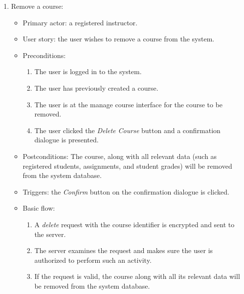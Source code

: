 \begin{enumerate}
\item Remove a course:
\begin{itemize}
    \item Primary actor: a registered instructor.
    \item User story: the user wishes to remove a course from the system.
    \item Preconditions:
        \begin{enumerate}
            \item The user is logged in to the system.
            \item The user has previously created a course.
            \item The user is at the manage course interface for the course
                to be removed.
            \item The user clicked the \emph{Delete Course} button and a
                confirmation dialogue is presented.
        \end{enumerate}
    \item Postconditions:
        The course, along with all relevant data (such as registered students,
        assignments, and student grades) will be removed from the system
        database.
    \item Triggers: the \emph{Confirm} button on the confirmation dialogue is
        clicked.
    \item Basic flow:
        \begin{enumerate}
            \item A \emph{delete} request with the course identifier is encrypted
                and sent to the server.
            \item The server examines the request and makes sure the user is
                authorized to perform such an activity.
            \item If the request is valid, the course along with all its
                relevant data will be removed from the system database.
        \end{enumerate}
\end{itemize}


\end{enumerate}
